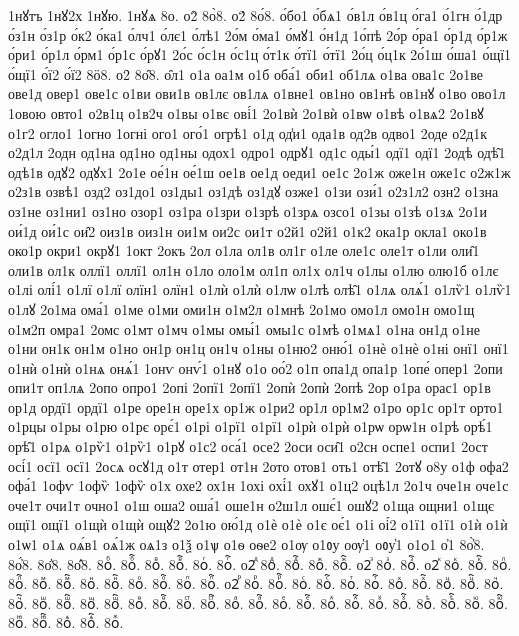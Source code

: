 {1нꙋтъ
1нꙋ2х
1нꙋю.
1нꙋѧ
8о.
о2̀
8о̀8.
о2́
8о́8.
о́бо1
о́бѧ1
о́в1л
о́в1ц
о́га1
о́1гн
о́1др
о́з1н
о́з1р
о́к2
о́ка1
о́лч1
о́лє1
о́лѣ1
2о́м
о́ма1
о́мꙋ1
о́н1д
1о́пѣ
2о́р
о́ра1
о́р1д
о́р1ж
о́ри1
о́р1л
о́рм1
о́р1с
о́рꙋ1
2о́с
о́с1н
о́с1ц
о́т1к
о́тї1
о́тї1
2о́ц
о́ц1к
2о́1ш
о́ша1
о́щї1
о́щї1
о́ї2
о́ї2
8ӧ8.
о2̑
8о̑8.
о̑л1
о1а
оа1м
о1б
оба́1
оби1
об1лѧ
о1ва
ова1с
2о1ве
ове1д
овер1
ове1с
о1ви
ови1в
ов1лє
ов1лѧ
о1вне1
ов1но
ов1нѣ
ов1нꙋ
о1во
ово1л
1овою
овто1
о2в1ц
о1в2ч
о1вы
о1вє
ові́1
2о1вѝ
2о1вѝ
о1вѡ
о1вѣ
о1вѧ2
2о1вꙋ
о1г2
огло1
1огно
1огні
ого1
ого́1
огрѣ1
о1д
од̾и1
ода1в
од2в
одво1
2оде
о2д1к
о2д1л
2одн
од1на
од1но
од1ны
одох1
одро1
одрꙋ1
од1с
оды́1
одї1
одї1
2одѣ
одѣ̑1
одѣ1в
одꙋ2
одꙋх1
2о1е
ое́1н
ое́1ш
ое1в
ое1д
оеди1
ое1с
2о1ж
оже1н
оже1с
о2ж1ж
о2з1в
озвѣ1
озд2
оз1до1
оз1ды1
оз1дѣ
оз1дꙋ
озже1
о1зи
ози́1
о2з1л2
озн2
о1зна
оз1не
оз1ни1
оз1но
озор1
оз1ра
о1зри
о1зрѣ
о1зрѧ
озсо1
о1зы
о1зѣ
о1зѧ
2о1и
ои́1д
ои́1с
ои̑2
оиз1в
оиз1н
ои1м
ои2с
ои1т
о2й1
о2й1
о1к2
ока1р
окла1
око1в
око1р
окри1
окрꙋ1
1окт
2окъ
2ол
о1ла
ол1в
ол1г
о1ле
оле1с
оле1т
о1ли
оли̑1
оли1в
ол1к
оллї1
оллї1
ол1н
о1ло
оло1м
ол1п
ол1х
ол1ч
о1лы
о1лю
олю1б
о1лє
о1лі
олі́1
о1лї
о1лї
олїн1
олїн1
о1лѝ
о1лѝ
о1лѡ
о1лѣ
олѣ̑1
о1лѧ
олѧ́1
о1лѷ1
о1лѷ1
о1лꙋ
2о1ма
ома́1
о1ме
о1ми
оми1н
о1м2л
о1мнѣ
2о1мо
омо1л
омо1н
омо1щ
о1м2п
омра1
2омс
о1мт
о1мч
о1мы
омы́1
омы1с
о1мѣ
о1мѧ1
о1на
он1д
о1не
о1ни
он1к
он1м
о1но
он1р
он1ц
он1ч
о1ны
о1ню2
оню́1
о1нѐ
о1нѐ
о1ні
онї1
онї1
о1нѝ
о1нѝ
о1нѧ
онѧ́1
1онѵ
онѵ́1
о1нꙋ
о1о
оо́2
о1п
опа1д
опа1р
1опе́
опер1
2опи
опи1т
оп1лѧ
2опо
опро1
2опі
2опї1
2опї1
2опѝ
2опѝ
2опѣ
2ор
о1ра
орас1
ор1в
ор1д
ордї1
ордї1
о1ре
оре1н
оре1х
ор1ж
о1ри2
ор1л
ор1м2
о1ро
ор1с
ор1т
орто1
о1рцы
о1ры
о1рю
о1рє
орє́1
о1рі
о1рї1
о1рї1
о1рѝ
о1рѝ
о1рѡ
орѡ1н
о1рѣ
орѣ́1
орѣ̑1
о1рѧ
о1рѷ1
о1рѷ1
о1рꙋ
о1с2
оса́1
осе2
2оси
оси̑1
о2сн
оспе1
оспи1
2ост
осі́1
осї1
осї1
2осѧ
осꙋ1д
о1т
отер1
от1н
2ото
отов1
оть1
отѣ̑1
2отꙋ
о8у  
о1ф
офа2
офа́1
1офѵ
1офѷ
1офѷ
о1х
охе2
ох1н
1охі
охі́1
охꙋ1
о1ц2
оцѣ1л
2о1ч
оче1н
оче1с
оче1т
очи1т
очно1
о1ш
оша2
оша́1
оше1н
о2ш1л
ошє́1
ошꙋ2
о1ща
ощни1
о1щє
ощї1
ощї1
о1щѝ
о1щѝ
ощꙋ2
2о1ю
ою́1д
о1ѐ
о1ѐ
о1є
оє́1
о1і
оі́2
о1ї1
о1ї1
о1ѝ
о1ѝ
о1ѡ1
о1ѧ
оѧ́в1
оѧ́1ж
оѧ1з
о1ѯ
о1ѱ
о1ѳ
оѳе2
о1ѹ
о1ᲂу
оѹ҆1
оᲂу҆1
о1ѻ1
о҆1
8о҆̀8.
8о҆́8.
8о҆̈8.
8о҆̑8.
8оⷠ.
8оⷠ҇.
8оⷡ.
8оⷡ҇.
8оⷢ.
8оⷢ҇.
о2ⷣ
8оⷣ.
8оⷣ҇.
8оⷤ.
8оⷤ҇.
о2ⷥ
8оⷥ.
8оⷥ҇.
о2ⷦ
8оⷦ.
8оⷦ҇.
8оⷧ.
8оⷧ҇.
8оⷨ.
8оⷨ҇.
8оⷩ.
8оⷩ҇.
8оⷪ.
8оⷪ҇.
8оⷫ.
8оⷫ҇.
о2ⷬ
8оⷬ.
8оⷬ҇.
8оⷭ.
8оⷭ҇.
8оⷮ.
8оⷮ҇.
8оⷯ.
8оⷯ҇.
8оⷰ.
8оⷰ҇.
8оⷱ.
8оⷱ҇.
8оⷲ.
8оⷲ҇.
8оⷳ.
8оⷳ҇.
8оⷴ.
8оⷴ҇.
8оⷵ.
8оⷵ҇.
8оⷶ.
8оⷶ҇.
8оⷷ.
8оⷷ҇.
8оⷸ.
8оⷸ҇.
8оⷹ.
8оⷹ҇.
8оⷺ.
8оⷺ҇.
8оⷻ.
8оⷻ҇.
8оⷼ.
8оⷼ҇.
8оⷽ.
8оⷽ҇.
8оⷾ.
}
